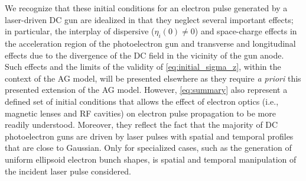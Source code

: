 We recognize that these initial conditions for an electron pulse generated by a laser-driven DC gun are idealized in that they neglect several important effects; in particular, the interplay of dispersive ($ \eta_{i}(0) \neq 0 $) and space-charge effects in the acceleration region of the photoelectron gun and transverse and longitudinal effects due to the divergence of the DC field in the vicinity of the gun anode.\cite{berger_dc_2009,togawa_ceb6_2007}
Such effects and the limits of the validity of \ref{eq:initial_sigma_z}, within the context of the AG model, will be presented elsewhere as they require \textit{a priori} this presented extension of the AG model.
However, \ref{eq:summary} also represent a defined set of initial conditions that allows the effect of electron optics (i.e., magnetic lenses and RF cavities) on electron pulse propagation to be more readily understood.
Moreover, they reflect the fact that the majority of DC photoelectron guns are driven by laser pulses with spatial and temporal profiles that are close to Gaussian.\cite{williamson_clocking_1997,sciaini_electronic_2009}
Only for specialized cases, such as the generation of uniform ellipsoid electron bunch shapes, is spatial and temporal manipulation of the incident laser pulse considered.\cite{luiten_how_2004,li_generating_2008}


